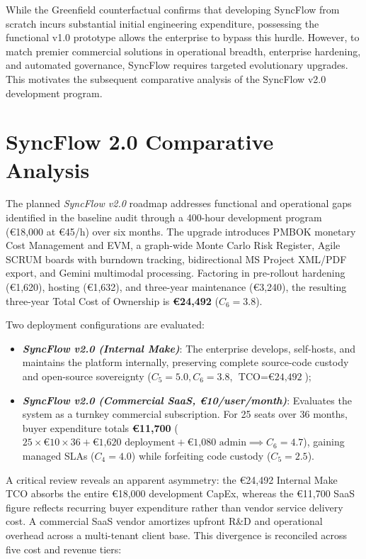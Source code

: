 While the Greenfield counterfactual confirms that developing SyncFlow from scratch incurs substantial initial engineering expenditure, possessing the functional v1.0 prototype allows the enterprise to bypass this hurdle. However, to match premier commercial solutions in operational breadth, enterprise hardening, and automated governance, SyncFlow requires targeted evolutionary upgrades. This motivates the subsequent comparative analysis of the SyncFlow v2.0 development program.

\newpage

\section{SyncFlow 2.0 Comparative Analysis}
The planned \textit{SyncFlow v2.0} roadmap addresses functional and operational gaps identified in the baseline audit through a 400-hour development program (€18,000 at €45/h) over six months. The upgrade introduces PMBOK monetary Cost Management and EVM, a graph-wide Monte Carlo Risk Register, Agile SCRUM boards with burndown tracking, bidirectional MS Project XML/PDF export, and Gemini multimodal processing. Factoring in pre-rollout hardening (€1,620), hosting (€1,632), and three-year maintenance (€3,240), the resulting three-year Total Cost of Ownership is \textbf{€24,492} ($C_6 = 3.8$). 

\vspace{3mm}

Two deployment configurations are evaluated:
\begin{itemize}[itemsep=1pt,topsep=1.5pt]
	\item \textbf{\textit{SyncFlow v2.0 (Internal Make)}}: The enterprise develops, self-hosts, and maintains the platform internally, preserving complete source-code custody and open-source sovereignty ($C_5 = 5.0, C_6 = 3.8$, $\text{TCO} = \text{€24,492}$);
	\item \textbf{\textit{SyncFlow v2.0 (Commercial SaaS, €10/user/month)}}: Evaluates the system as a turnkey commercial subscription. For 25 seats over 36 months, buyer expenditure totals \textbf{€11,700} ($25 \times \text{€10} \times 36 + \text{€1,620} \text{ deployment} + \text{€1,080} \text{ admin} \implies C_6 = 4.7$), gaining managed SLAs ($C_4 = 4.0$) while forfeiting code custody ($C_5 = 2.5$).
\end{itemize}

\vspace{2mm}

A critical review reveals an apparent asymmetry: the €24,492 Internal Make TCO absorbs the entire €18,000 development CapEx, whereas the €11,700 SaaS figure reflects recurring buyer expenditure rather than vendor service delivery cost. A commercial SaaS vendor amortizes upfront R\&D and operational overhead across a multi-tenant client base. This divergence is reconciled across five cost and revenue tiers:

